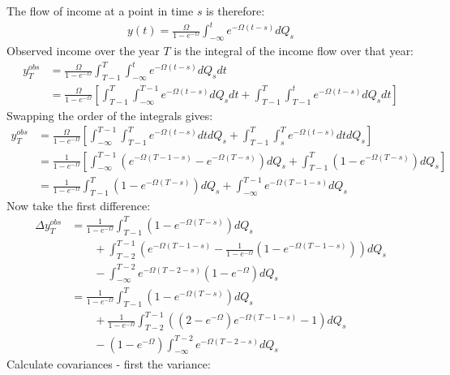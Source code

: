 The flow of income at a point in time $s$ is therefore:
\begin{align*}
y(t) = \frac{\Omega}{1-e^{-\Omega}} \int_{-\infty}^{t} e^{-\Omega (t-s)}dQ_s
\end{align*}
Observed income over the year $T$ is the integral of the income flow over that year:
\begin{align*}
y_T^{obs} &=\frac{\Omega}{1-e^{-\Omega}} \int_{T-1}^{T} \int_{-\infty}^{t} e^{-\Omega (t-s)}dQ_s dt \\
&= \frac{\Omega}{1-e^{-\Omega}} \left[ \int_{T-1}^{T} \int_{-\infty}^{T-1} e^{-\Omega (t-s)}dQ_s dt + \int_{T-1}^{T} \int_{T-1}^{t} e^{-\Omega (t-s)}dQ_s dt \right] 
\end{align*}
Swapping the order of the integrals gives:
\begin{align*}
y_T^{obs} &=\frac{\Omega}{1-e^{-\Omega}} \left[ \int_{-\infty}^{T-1} \int_{T-1}^{T} e^{-\Omega (t-s)} dt dQ_s  + \int_{T-1}^{T} \int_{s}^{T} e^{-\Omega (t-s)} dt dQ_s \right] \\
&=\frac{1}{1-e^{-\Omega}} \left[ \int_{-\infty}^{T-1} ( e^{-\Omega (T-1-s)} - e^{-\Omega (T-s)}) dQ_s  + \int_{T-1}^{T}  ( 1 - e^{-\Omega (T-s)} ) dQ_s \right] \\
&= \frac{1}{1-e^{-\Omega}}\int_{T-1}^{T}  ( 1 - e^{-\Omega (T-s)} ) dQ_s  + \int_{-\infty}^{T-1}  e^{-\Omega (T-1-s)} dQ_s  
\end{align*}
Now take the first difference:
\begin{align*}
\Delta y_T^{obs} &=\frac{1}{1-e^{-\Omega}}\int_{T-1}^{T}  ( 1 - e^{-\Omega (T-s)} ) dQ_s \\ & \qquad + \int_{T-2}^{T-1} \left( e^{-\Omega (T-1-s)}   - \frac{1}{1-e^{-\Omega}}  ( 1 - e^{-\Omega (T-1-s)} ) \right) dQ_s \\
& \qquad - \int_{-\infty}^{T-2}  e^{-\Omega (T-2-s)} (1-e^{-\Omega}) dQ_s  \\
&=\frac{1}{1-e^{-\Omega}}\int_{T-1}^{T}  ( 1 - e^{-\Omega (T-s)} ) dQ_s \\ & \qquad +  \frac{1}{1-e^{-\Omega}} \int_{T-2}^{T-1}\left( (2-e^{-\Omega}) e^{-\Omega (T-1-s)} -1  \right)dQ_s \\
& \qquad -  (1-e^{-\Omega}) \int_{-\infty}^{T-2}  e^{-\Omega (T-2-s)} dQ_s 
\end{align*}
Calculate covariances - first the variance:
